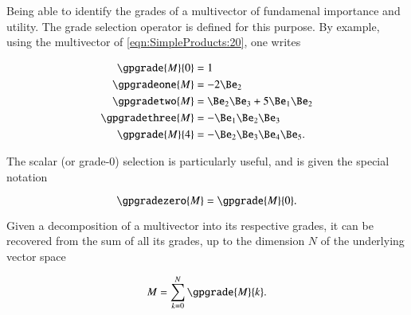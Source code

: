 Being able to identify the grades of a multivector of fundamenal importance and utility.  The grade
selection operator is defined for this purpose.
By example, using the multivector of \cref{eqn:SimpleProducts:20}, one writes

\begin{dmath}\label{eqn:SimpleProducts:140}
\begin{aligned}
   \gpgrade{M}{0} &= 1 \\
   \gpgradeone{M} &= - 2 \Be_2 \\
   \gpgradetwo{M} &= \Be_2 \Be_3 + 5 \Be_1 \Be_2 \\
   \gpgradethree{M} &= - \Be_1 \Be_2 \Be_3 \\
   \gpgrade{M}{4} &= -\Be_2 \Be_3 \Be_4 \Be_5.
\end{aligned}
\end{dmath}

The scalar (or grade-0) selection is particularly useful, and is given the special notation

\begin{dmath}\label{eqn:SimpleProducts:180}
\gpgradezero{M} = \gpgrade{M}{0}.
\end{dmath}

Given a decomposition of a multivector into its respective grades, it can be recovered from the sum of all its grades, up to the dimension \( N \) of the underlying vector space

\begin{dmath}\label{eqn:SimpleProducts:160}
   M = \sum_{k = 0}^N \gpgrade{M}{k}.
\end{dmath}
